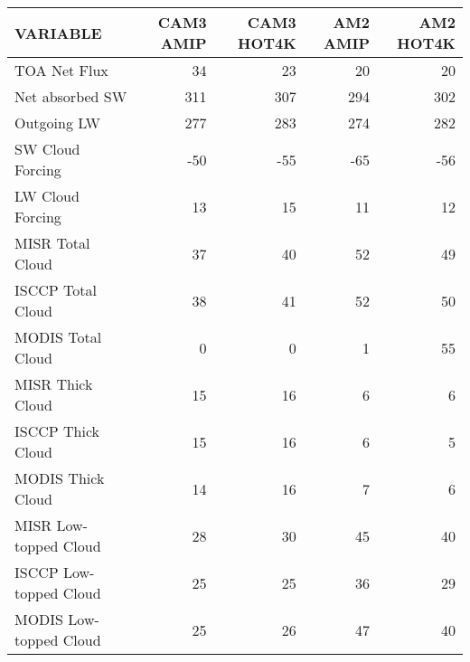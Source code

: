 \begin{tabular}{lrrrr}
\hline
                VARIABLE &                CAM3 AMIP &               CAM3 HOT4K &                 AM2 AMIP &                AM2 HOT4K \\ \hline
            TOA Net Flux &                       34 &                       23 &                       20 &                       20 \\
         Net absorbed SW &                      311 &                      307 &                      294 &                      302 \\
             Outgoing LW &                      277 &                      283 &                      274 &                      282 \\
        SW Cloud Forcing &                      -50 &                      -55 &                      -65 &                      -56 \\
        LW Cloud Forcing &                       13 &                       15 &                       11 &                       12 \\
        MISR Total Cloud &                       37 &                       40 &                       52 &                       49 \\
       ISCCP Total Cloud &                       38 &                       41 &                       52 &                       50 \\
       MODIS Total Cloud &                        0 &                        0 &                        1 &                       55 \\
        MISR Thick Cloud &                       15 &                       16 &                        6 &                        6 \\
       ISCCP Thick Cloud &                       15 &                       16 &                        6 &                        5 \\
       MODIS Thick Cloud &                       14 &                       16 &                        7 &                        6 \\
   MISR Low-topped Cloud &                       28 &                       30 &                       45 &                       40 \\
  ISCCP Low-topped Cloud &                       25 &                       25 &                       36 &                       29 \\
  MODIS Low-topped Cloud &                       25 &                       26 &                       47 &                       40 \\

\end{tabular}
